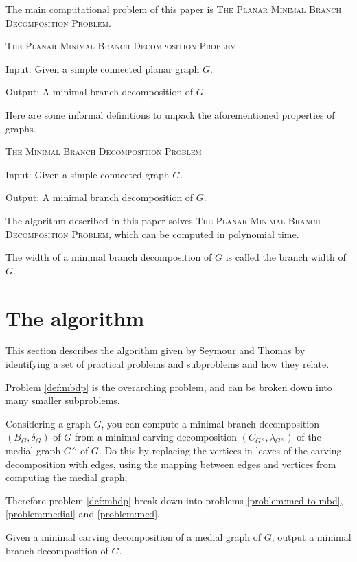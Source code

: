 \documentclass{article}
\begin{document}
	The main computational problem of this paper is \textsc{The Planar Minimal Branch Decomposition Problem}.

	\begin{definition}
		\textsc{The Planar Minimal Branch Decomposition Problem}

		Input: Given a simple connected planar graph $G$.

		Output: A minimal branch decomposition of $G$.
	\end{definition}

	Here are some informal definitions to unpack the aforementioned properties of graphs.

	\begin{definition}\label{def:mbdp}
		\textsc{The Minimal Branch Decomposition Problem}

		Input: Given a simple connected graph $G$.

		Output: A minimal branch decomposition of $G$.
	\end{definition}

	The algorithm described in this paper solves \textsc{The Planar Minimal Branch Decomposition Problem}, which can be computed in polynomial time.

	The width of a minimal branch decomposition of $G$ is called the branch width of $G$.

\section{The algorithm}
	This section describes the algorithm given by Seymour and Thomas\cite{ST93} by identifying a set of practical problems and subproblems and how they relate.
	
	Problem \ref{def:mbdp} is the overarching problem, and can be broken down into many smaller subproblems.

	Considering a graph $G$, you can compute a minimal branch decomposition $(B_G, \delta_G)$ of $G$ from a minimal carving decomposition $(C_{G^\times}, \lambda_{G^\times})$ of the medial graph $G^\times$ of $G$. Do this by replacing the vertices in leaves of the carving decomposition with edges, using the mapping between edges and vertices from computing the medial graph; 

	Therefore problem \ref{def:mbdp} break down into problems \ref{problem:mcd-to-mbd}, \ref{problem:medial} and \ref{problem:mcd}.

	\begin{problem}\label{problem:mcd-to-mbd}
		Given a minimal carving decomposition of a medial graph of $G$, output a minimal branch decomposition of $G$.
	\end{problem}
\end{document}
